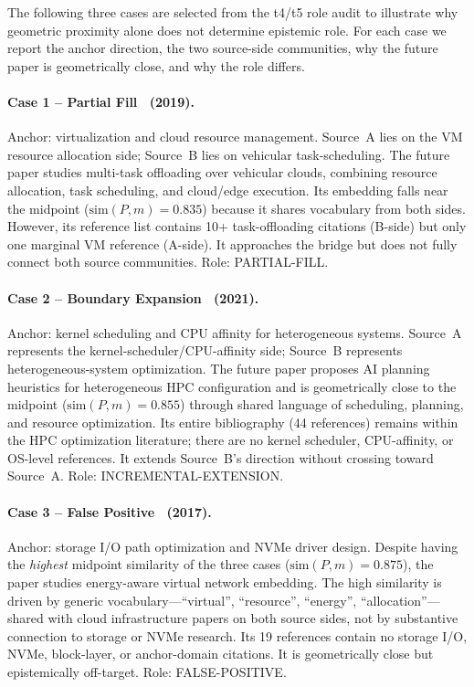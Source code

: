 \documentclass[11pt,twocolumn]{article}
\begin{document}
The following three cases are selected from the t4/t5 role audit to illustrate
why geometric proximity alone does not determine epistemic role.
For each case we report the anchor direction, the two source-side communities,
why the future paper is geometrically close, and why the role differs.

\paragraph{Case 1 -- Partial Fill~\cite{case1} (2019).}
Anchor: virtualization and cloud resource management.
Source~A lies on the VM resource allocation side; Source~B lies on
vehicular task-scheduling. The future paper studies multi-task offloading
over vehicular clouds, combining resource allocation, task scheduling,
and cloud/edge execution. Its embedding falls near the midpoint
($\mathrm{sim}(P,m){=}0.835$) because it shares vocabulary from both sides.
However, its reference list contains 10+ task-offloading citations (B-side)
but only one marginal VM reference (A-side).
It approaches the bridge but does not fully connect both source communities.
Role: PARTIAL-FILL.

\paragraph{Case 2 -- Boundary Expansion~\cite{case2} (2021).}
Anchor: kernel scheduling and CPU affinity for heterogeneous systems.
Source~A represents the kernel-scheduler/CPU-affinity side; Source~B represents
heterogeneous-system optimization. The future paper proposes AI planning heuristics
for heterogeneous HPC configuration and is geometrically close to the midpoint
($\mathrm{sim}(P,m){=}0.855$) through shared language of scheduling, planning,
and resource optimization.
Its entire bibliography (44 references) remains within the HPC optimization
literature; there are no kernel scheduler, CPU-affinity, or OS-level references.
It extends Source~B's direction without crossing toward Source~A.
Role: INCREMENTAL-EXTENSION.

\paragraph{Case 3 -- False Positive~\cite{case3} (2017).}
Anchor: storage I/O path optimization and NVMe driver design.
Despite having the \emph{highest} midpoint similarity of the three cases
($\mathrm{sim}(P,m){=}0.875$), the paper studies energy-aware virtual network
embedding. The high similarity is driven by generic vocabulary---``virtual'',
``resource'', ``energy'', ``allocation''---shared with cloud infrastructure papers
on both source sides, not by substantive connection to storage or NVMe research.
Its 19 references contain no storage I/O, NVMe, block-layer, or anchor-domain
citations. It is geometrically close but epistemically off-target.
Role: FALSE-POSITIVE.
\end{document}
